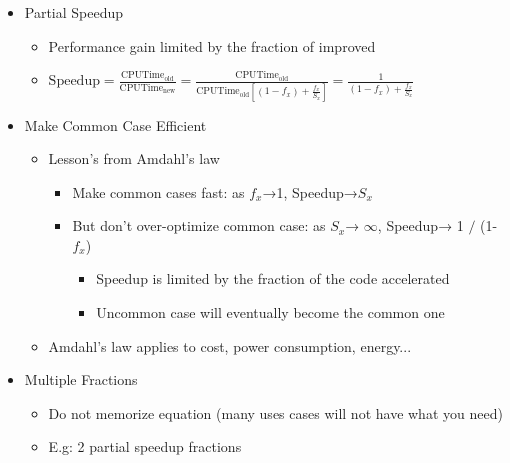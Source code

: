 \documentclass[12pt]{article}
\begin{document}
                \begin{itemize}
                    \item {Partial Speedup}
                        \begin{itemize}
                            \item {Performance gain limited by the fraction of improved}
                            \item {$\text{Speedup}=\frac{\text{CPUTime}_{\text{old}}}{\text{CPUTime}_{\text{new}}}=\frac{\text{CPUTime}_{\text{old}}}{\text{CPUTime}_{\text{old}}\left[\left(1-f_x\right)+\frac{f_x}{S_x}\right]}=\frac{1}{\left(1-f_x\right)+\frac{f_x}{S_x}}$}
                        \end{itemize}
                    \item {Make Common Case Efficient}
                        \begin{itemize}
                            \item {Lesson’s from Amdahl’s law} 
                                \begin{itemize}
                                    \item {Make common cases fast: as $f_x$→1, Speedup→$S_x$}
                                    \item {But don’t over-optimize common case: as $S_x$→ $\infty$, Speedup→ 1 $/$ (1-$f_x$)}
                                        \begin{itemize}
                                            \item {Speedup is limited by the fraction of the code         accelerated}
                                            \item {Uncommon case will eventually become the common one}
                                        \end{itemize}
                                \end{itemize}
                            \item {Amdahl’s law applies to cost, power consumption, energy...}
                        \end{itemize}
                    \item {Multiple Fractions}
                        \begin{itemize}
                            \item {Do not memorize equation (many uses cases will not have what you need)}
                            \item {E.g: 2 partial speedup fractions}
                        \end{itemize}
                \end{itemize}
\end{document}
